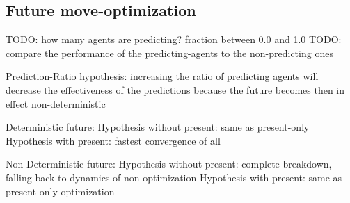 \subsection{Future move-optimization}
TODO: how many agents are predicting? fraction between 0.0 and 1.0
TODO: compare the performance of the predicting-agents to the non-predicting ones

Prediction-Ratio
	hypothesis: increasing the ratio of predicting agents will decrease the effectiveness of the predictions because the future becomes then in effect non-deterministic

Deterministic future:
	Hypothesis without present:  	same as present-only
	Hypothesis with present: 		fastest convergence of all
		
Non-Deterministic future:
	Hypothesis without present: 	complete breakdown, falling back to dynamics of non-optimization
	Hypothesis with present: 		same as present-only optimization